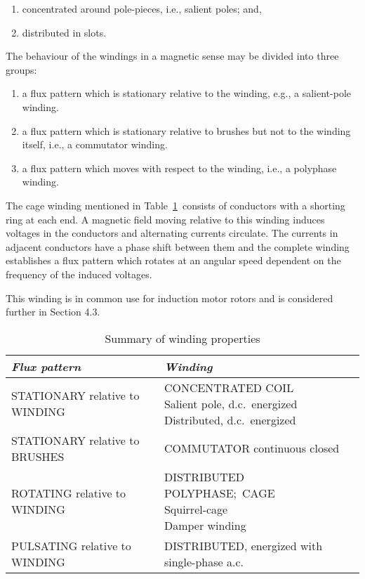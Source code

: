 \documentclass[a4paper,numbers=noenddot,12pt]{scrbook}
\begin{document}
            \begin{enumerate}
                \item concentrated around pole-pieces, i.e., salient poles; and, 
                \item distributed in slots. 
            \end{enumerate}

            The behaviour of the windings in a magnetic sense may be divided into three groups:
            \begin{enumerate}
                \item a flux pattern which is stationary relative to the winding, e.g., a salient-pole winding.
                \item a flux pattern which is stationary relative to brushes but not to the winding itself, i.e., a commutator winding. 
                \item a flux pattern which moves with respect to the winding, i.e., a polyphase winding. 
            \end{enumerate}
            The cage winding mentioned in Table~\ref{tab:Table4.1}\ consists of conductors with a shorting ring at each end. A magnetic field moving relative to this winding induces voltages in the conductors and alternating currents circulate. The currents in adjacent conductors have a phase shift between them and the complete winding establishes a flux pattern which rotates at an angular speed dependent on the frequency of the induced voltages.

            This winding is in common use for induction motor rotors and is considered further in Section 4.3.
            \begin{table}
                \caption{Summary of winding properties}
                \centering
                \begin{tabular}{p{4cm} p{7cm}}
                    \toprule
                    \parbox{4cm}{\centering \textit{Flux pattern}} & \parbox{7cm}{\centering \textit{Winding}} \\ \toprule
                    STATIONARY relative to WINDING & \parbox[t]{7cm}{CONCENTRATED COIL\\Salient pole, d.c.\ energized\\Distributed, d.c.\ energized}\\ \midrule
                    STATIONARY relative to BRUSHES & COMMUTATOR continuous closed \\ \midrule
                    ROTATING relative to WINDING & \parbox[t]{7cm}{DISTRIBUTED POLYPHASE;\ CAGE \\\indent Squirrel-cage\\Damper winding}\\ \midrule
                    PULSATING relative to WINDING & DISTRIBUTED, energized with single-phase a.c. \\ \bottomrule
                \end{tabular}\label{tab:Table4.1}
            \end{table}
\end{document}
